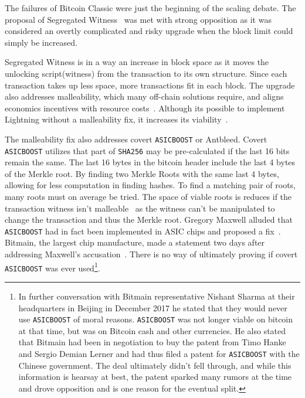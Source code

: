 The failures of Bitcoin Classic were just the beginning of the scaling debate. The proposal of Segregated Witness~\cite{bip:0141:segwit} was met with strong opposition as it was considered an overtly complicated and risky upgrade when the block limit could simply be increased. 

Segregated Witness is in a way an increase in block space as it moves the unlocking script(witness) from the transaction to its own structure. Since each transaction takes up less space, more transactions fit in each block. The upgrade also addresses malleability, which many off-chain solutions require, and aligns economics incentives with resource costs~\cite{antonopoulos:segregated:witness:align:economic:incentives}. Although its possible to implement Lightning without a malleability fix, it increases its viability~\cite{song:lightning:malleability}.

The malleability fix also addresses covert \texttt{ASICBOOST} or Antbleed. Covert \texttt{ASICBOOST} utilizes that part of \texttt{SHA256} may be pre-calculated if the last 16 bits remain the same. The last 16 bytes in the bitcoin header include the last 4 bytes of the Merkle root. By finding two Merkle Roots with the same last 4 bytes, allowing for less computation in finding \gls{hash}es. To find a matching pair of roots, many roots must on average be tried. The space of viable roots is reduces if the transaction witness isn't malleable~\cite{song:asicboost} as the witness can't be manipulated to change the transaction and thus the Merkle root. Gregory Maxwell alluded that \texttt{ASICBOOST} had in fact been implemented in ASIC chips and proposed a fix~\cite{maxwell:asicboost:fix}. Bitmain, the largest chip manufacture, made a statement two days after addressing Maxwell's accusation~\cite{bitmain:response}. There is no way of ultimately proving if covert \texttt{ASICBOOST} was ever used\footnote{In further conversation with Bitmain representative Nishant Sharma at their headquarters in Beijing in December 2017 he stated that they would never use \texttt{ASICBOOST} of moral reasons. \texttt{ASICBOOST} was not longer viable on \gls{bitcoin} at that time, but was on Bitcoin cash and other currencies. He also stated that Bitmain had been in negotiation to buy the patent from Timo Hanke and Sergio Demian Lerner and had thus filed a patent for \texttt{ASICBOOST} with the Chinese government. The deal ultimately didn't fell through, and while this information is hearsay at best, the patent sparked many rumors at the time and drove opposition and is one reason for the eventual split.}. 

